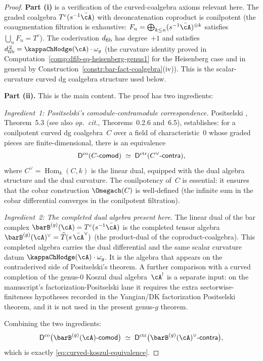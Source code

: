 \begin{proof}
\textbf{Part (i)} is a verification of the curved-coalgebra axioms
relevant here. The
graded coalgebra $T^c(s^{-1}\bar\cA)$ with deconcatenation
coproduct is conilpotent (the coaugmentation filtration is
exhaustive: $F_n = \bigoplus_{k \leq n} (s^{-1}\bar\cA)^{\otimes k}$
satisfies $\bigcup_n F_n = T^c$). The coderivation $d_{\mathrm{fib}}$ has
degree~$+1$ and satisfies $\dfib^{\,2} = \kappaChHodge(\cA) \cdot \omega_g$
(the curvature identity proved in
Computation~\ref{comp:dfib-sq-heisenberg-genus1} for the
Heisenberg case and in general by
Construction~\ref{constr:bar-fact-coalgebra}(iv)). This is the
scalar-curvature curved dg coalgebra structure used below.

\smallskip\noindent
\textbf{Part (ii).} This is the main content. The proof has
two ingredients:

\smallskip\noindent
\emph{Ingredient~1: Positselski's comodule-contramodule
correspondence.}
Positselski \cite{Pos11}, Theorem~5.3 (see also
\emph{op.\ cit.}, Theorems~0.2.6 and~6.5), establishes:
for a conilpotent curved dg coalgebra~$C$ over a field of
characteristic~$0$ whose graded pieces are finite-dimensional,
there is an equivalence
\[
 \mathsf{D}^{\mathrm{co}}(C\text{-}\mathsf{comod})
 \;\simeq\;
 \mathsf{D}^{\mathrm{ctr}}(C^\vee\text{-}\mathsf{contra}),
\]
where $C^\vee = \operatorname{Hom}_k(C, k)$ is the linear dual,
equipped with the dual algebra structure and the dual curvature.
The conilpotency of~$C$ is essential: it ensures that the cobar
construction $\Omegach(C)$ is well-defined (the infinite sum in
the cobar differential converges in the conilpotent filtration).

\smallskip\noindent
\emph{Ingredient~2: The completed dual algebra present here.}
The linear dual of the bar complex $\barB^{(g)}(\cA) =
T^c(s^{-1}\bar\cA)$ is the completed tensor algebra
$\barB^{(g)}(\cA)^\vee = \widehat{T}(s\,\bar\cA^\vee)$
(the product-dual of the coproduct-coalgebra). This completed
algebra carries the dual differential and the same scalar
curvature datum $\kappaChHodge(\cA) \cdot \omega_g$. It is the algebra that
appears on the contraderived side of Positselski's theorem. A
further comparison with a curved completion of the genus-$0$
Koszul dual algebra~$\cA^!$ is a separate input: on the
manuscript's factorization-Positselski lane it requires the extra
sectorwise-finiteness hypotheses recorded in the Yangian/DK
factorization Positselski theorem, and it is not used in the
present genus-$g$ theorem.

Combining the two ingredients:
\[
 \Dco\bigl(\barB^{(g)}(\cA)\text{-}\mathsf{comod}\bigr)
 \;\simeq\;
 \Dctr\bigl(\barB^{(g)}(\cA)^\vee\text{-}\mathsf{contra}\bigr),
\]
which is exactly \eqref{eq:curved-koszul-equivalence}.


\end{proof}
